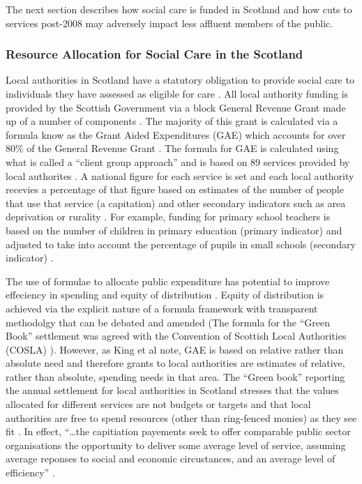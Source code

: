 \documentclass[12pt,]{report}
\begin{document}
The next section describes how social care is funded in Scotland and how
cuts to services post-2008 may adversely impact less affluent members of
the public.

\subsubsection{Resource Allocation for Social Care in the Scotland}\label{subsubsec:resources-scot}

Local authorities in Scotland have a statutory obligation to provide
social care to individuals they have assessed as eligible for care
\citep{RN449}. All local authority funding is provided by the Scottish
Government via a block General Revenue Grant made up of a number of
components \citep{RN448, RN445}. The majority of this grant is
calculated via a formula know as the Grant Aided Expenditures (GAE)
which accounts for over 80\% of the General Revenue Grant \citep{RN450}.
The formula for GAE is calculated using what is called a ``client group
approach'' and is based on 89 services provided by local authorites
\citep{RN450}. A national figure for each service is set and each local
authority recevies a percentage of that figure based on estimates of the
number of people that use that service (a capitation) and other
secondary indicators such as area deprivation or rurality
\citep{RN450, RN444}. For example, funding for primary school teachers
is based on the number of children in primary education (primary
indicator) and adjusted to take into account the percentage of pupils in
small schools (secondary indicator) \citep{RN450}.

The use of formulae to allocate public expenditure has potential to
improve effeciency in spending and equity of distribution \citep{RN444}.
Equity of distribution is achieved via the explicit nature of a formula
framework with transparent methodolgy that can be debated and amended
\citep{RN444} (The formula for the ``Green Book'' settlement was agreed
with the Convention of Scottish Local Authorities (COSLA)
\citep{RN448}). However, as King et al \citeyearpar{RN445} note, GAE is
based on relative rather than absolute need and therefore grants to
local authorities are estimates of relative, rather than absolute,
spending needs in that area. The ``Green book'' reporting the annual
settlement for local authorities in Scotland stresses that the values
allocated for different services are not budgets or targets and that
local authorities are free to spend resources (other than ring-fenced
monies) as they see fit \citep{RN450}. In effect, ``\ldots{}the
capitiation payements seek to offer comparable public sector
organisations the opportunity to deliver some average level of service,
assuming average reponses to social and economic circustances, and an
average level of efficiency'' \citep[pp.309]{RN444}.
\end{document}
